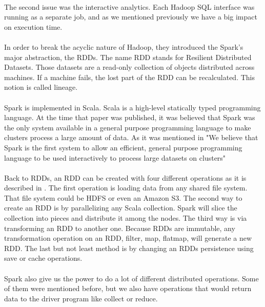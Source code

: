\paragraph{}The second issue was the interactive analytics. Each Hadoop SQL interface was running as a separate job, and as we mentioned previously we have a big impact on execution time.

\paragraph{}In order to break the acyclic nature of Hadoop, they introduced the Spark's major abstraction, the RDDs. The name RDD stands for Resilient Distributed Datasets. Those datasets are a read-only collection of objects distributed across machines. If a machine fails, the lost part of the RDD can be recalculated. This notion is called lineage.

\paragraph{}Spark is implemented in Scala. Scala is a high-level statically typed programming language. At the time that paper was published, it was believed that Spark was the only system available in a general purpose programming language to make clusters process a large amount of data. As it was mentioned in \cite{Zaharia:2010:SCC:1863103.1863113} "We believe that Spark is the first system to allow an efficient, general purpose programming language to be used interactively to process large datasets on clusters"

\paragraph{}Back to RDDs, an RDD can be created with four different operations as it is described in \cite{Zaharia:2010:SCC:1863103.1863113}. The first operation is loading data from any shared file system. That file system could be HDFS or even an Amazon S3. The second way to create an RDD is by parallelizing any Scala collection. Spark will slice the collection into pieces and distribute it among the nodes. The third way is via transforming an RDD to another one. Because RDDs are immutable, any transformation operation on an RDD, filter, map, flatmap, will generate a new RDD. The last but not least method is by changing an RDDs persistence using save or cache operations.

\paragraph{}Spark also give us the power to do a lot of different distributed operations. Some of them were mentioned before, but we also have operations that would return data to the driver program like collect or reduce. 

